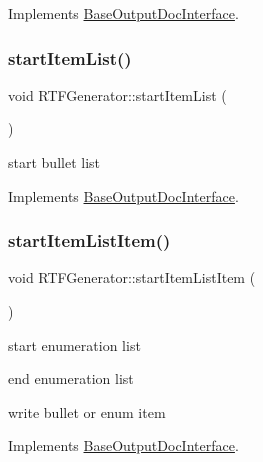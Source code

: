 Implements \mbox{\hyperlink{class_base_output_doc_interface_ab52dbf41ce337c701f9cd1e7794f80e7}{Base\+Output\+Doc\+Interface}}.

\mbox{\label{class_r_t_f_generator_a277db06db2dc29602f3209ca899111c9}} 
\subsubsection{\texorpdfstring{startItemList()}{startItemList()}}
{\footnotesize\ttfamily void R\+T\+F\+Generator\+::start\+Item\+List (\begin{DoxyParamCaption}{ }\end{DoxyParamCaption})\hspace{0.3cm}{\ttfamily [virtual]}}

start bullet list 

Implements \mbox{\hyperlink{class_base_output_doc_interface_a54b169393594b6cf113977ccccaeb9ee}{Base\+Output\+Doc\+Interface}}.

\mbox{\label{class_r_t_f_generator_ae09155b5cf6fb7457ae598f22d65d045}} 
\subsubsection{\texorpdfstring{startItemListItem()}{startItemListItem()}}
{\footnotesize\ttfamily void R\+T\+F\+Generator\+::start\+Item\+List\+Item (\begin{DoxyParamCaption}{ }\end{DoxyParamCaption})\hspace{0.3cm}{\ttfamily [virtual]}}

start enumeration list

end enumeration list

write bullet or enum item 

Implements \mbox{\hyperlink{class_base_output_doc_interface_aa1cbcadfedf8e6d52029d17526b5fa3f}{Base\+Output\+Doc\+Interface}}.

\mbox{\label{class_r_t_f_generator_a98ea7dff7770c95c08f7f82dc872881b}} 
